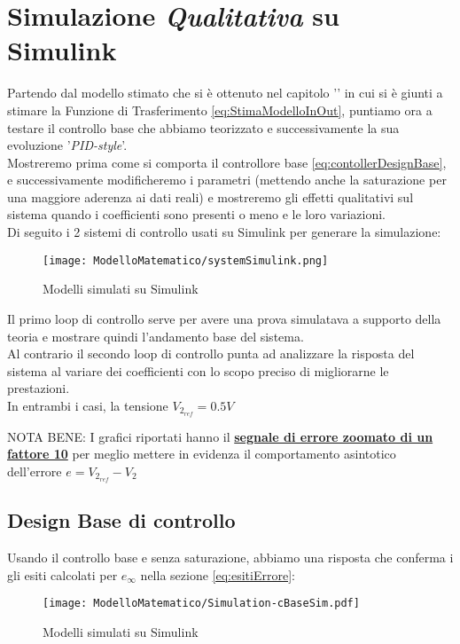 \newpage

\section{Simulazione \textit{Qualitativa} su Simulink}
Partendo dal modello stimato che si è ottenuto nel capitolo '' in cui si è giunti a stimare la Funzione di Trasferimento \ref{eq:StimaModelloInOut}, puntiamo ora a testare il controllo base che abbiamo teorizzato e successivamente la sua evoluzione '\textit{PID-style}'.\\
Mostreremo prima come si comporta il controllore base \ref{eq:contollerDesignBase}, e successivamente modificheremo i parametri (mettendo anche la saturazione per una maggiore aderenza ai dati reali) e mostreremo gli effetti qualitativi sul sistema quando i coefficienti sono presenti o meno e le loro variazioni.\\
Di seguito i 2 sistemi di controllo usati su Simulink per generare la simulazione:\vspace{-4mm}
\begin{figure}[H]
	\centering
	\caption[Modelli simulati su Simulink]{Modelli simulati su Simulink}
	\texttt{[image: ModelloMatematico/systemSimulink.png]}
\end{figure}\vspace{-6mm}
\noindent
Il primo loop di controllo  serve per avere una prova simulatava a supporto della teoria e mostrare quindi l'andamento base del sistema.\\
Al contrario il secondo loop di controllo punta ad analizzare la risposta del sistema al variare dei coefficienti con lo scopo preciso di migliorarne le prestazioni.\\
In entrambi i casi, la tensione $ V_{2_{ref}} = 0.5V$
\begin{mdframed}[backgroundcolor=fawn]
\begin{spacing}{1}
	\noindent
	{\footnotesize NOTA BENE: I grafici riportati hanno il \textbf{\underline{segnale di errore zoomato di un fattore 10}} per meglio mettere in evidenza il comportamento asintotico dell'errore $ e = V_{2_{ref}} - V_2 $}
\end{spacing}
\end{mdframed}
\newpage

\subsection{Design Base di controllo}
Usando il controllo base e senza saturazione, abbiamo una risposta che conferma i gli esiti calcolati per $ e_\infty $ nella sezione \ref{eq:esitiErrore}:
\begin{figure}[H]
	\centering
	\caption[Modelli simulati su Simulink]{Modelli simulati su Simulink}
	\texttt{[image: ModelloMatematico/Simulation-cBaseSim.pdf]}
\end{figure}

